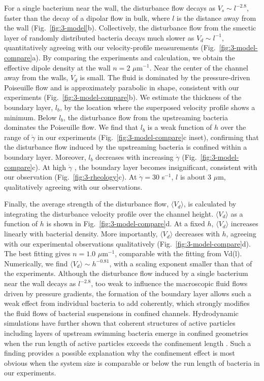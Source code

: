 For a single bacterium near the wall, the disturbance flow decays as $V_s\sim l^{-2.8}$, faster than the decay of a dipolar
flow in bulk, where $l$ is the distance away from the wall (Fig.~\ref{fig:3-model}b).
Collectively, the disturbance flow from the smectic layer of randomly distributed bacteria decays much slower as $V_d \sim l^{-1}$, quantitatively agreeing with our velocity-profile measurements (Fig.~\ref{fig:3-model-compare}a). By comparing the experiments and calculation, we obtain the effective dipole density at the wall $n = 2$ $\mu$m$^{-1}$. Near the center of the channel away from the walls, $V_d$ is small. The fluid is dominated by the pressure-driven Poiseuille flow and is approximately parabolic in shape, consistent with our experiments (Fig.~\ref{fig:3-model-compare}b). We estimate the thickness of the boundary layer, $l_b$, by the location where the superposed velocity profile shows a minimum. Below $l_b$, the disturbance flow from the upstreaming bacteria dominates the
Poiseuille flow. We find that $l_b$ is a weak function of $h$ over the range of $\dot\gamma$ in our experiments (Fig.~\ref{fig:3-model-compare}c inset), confirming that the disturbance flow induced by the upstreaming bacteria is confined within a boundary layer. Moreover, $l_b$ decreases with increasing $\dot\gamma$ (Fig.~\ref{fig:3-model-compare}c).
At high $\dot\gamma$ , the boundary layer becomes insignificant, consistent with our observation (Fig.~\ref{fig:3-rheology}c). At $\dot\gamma = 30$ s$^{-1}$, $l$ is about 3 $\mu$m, qualitatively agreeing with our observations.

Finally, the average strength of the disturbance flow, $\langle V_d \rangle$, is calculated by integrating the disturbance velocity
profile over the channel height. $\langle V_d \rangle$ as a function of $h$ is shown in Fig.~\ref{fig:3-model-compare}d. At a fixed $h$, $\langle V_d \rangle$ increases linearly with bacterial density. More importantly, $\langle V_d \rangle$ decreases with $h$,
agreeing with our experimental observations qualitatively (Fig.~\ref{fig:3-model-compare}d). The best fitting gives $n = 1.0$ $\mu$m$^{-1}$, comparable with the fitting from Vd(l). Numerically, we find $\langle V_d \rangle \sim h^{-0.81}$, with a scaling exponent smaller than that of the experiments. Although the disturbance flow induced by a single bacterium near the wall decays as $l^{-2.8}$, too weak to influence the macroscopic fluid flows driven by pressure gradients, the formation of the boundary layer allows such a weak effect from individual bacteria to add coherently, which strongly modifies the fluid flows of bacterial suspensions in confined channels. Hydrodynamic simulations have further shown that coherent structures of active particles including layers of upstream swimming bacteria emerge in confined geometries when the run length of active particles exceeds the confinement length \cite{Nash2010}. Such a finding provides a possible explanation why the confinement effect is most obvious when the system size is comparable or below the run length of bacteria in our experiments.

